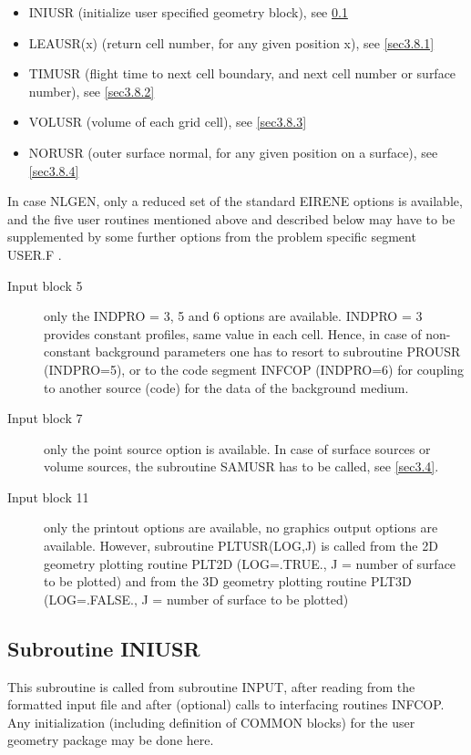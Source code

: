 \begin{itemize}
  \item INIUSR (initialize user specified geometry block), see \cref{sec3.8.0}
  \item LEAUSR(x) (return cell number, for any given position x), see
        \cref{sec3.8.1}
  \item TIMUSR (flight time to next cell boundary, and next cell
        number or surface number), see \cref{sec3.8.2}
  \item VOLUSR (volume of each
        grid cell), see \cref{sec3.8.3}
  \item NORUSR (outer surface normal, for any
        given position on a surface), see \cref{sec3.8.4}
\end{itemize}
In case NLGEN,
only a reduced set of the standard EIRENE options is available, and the five
user routines mentioned above and described below may have to be supplemented
by some further options from the problem specific segment USER.F .
\begin{description}
  \item[Input block 5] 

        only the INDPRO = 3, 5 and 6 options are available.
        INDPRO = 3 provides constant profiles, same value in each cell.
        Hence, in case of non-constant background parameters one has to resort to
        subroutine PROUSR (INDPRO=5), or to the code segment INFCOP (INDPRO=6) for
        coupling to another source (code) for the data of the background medium.
  \item[Input block 7] only the point source option is available.
        In case of surface sources or volume sources, the subroutine SAMUSR has to be
        called, see \cref{sec3.4}.
  \item[Input block 11] only the printout options are available, no graphics
        output options are available.
        However, subroutine PLTUSR(LOG,J) is called from the 2D geometry plotting
        routine PLT2D (LOG=.TRUE., J = number of surface to be plotted) and from the 3D
        geometry plotting routine PLT3D (LOG=.FALSE., J = number of surface to be
        plotted)
\end{description}

\subsection{Subroutine INIUSR} \label{sec3.8.0} 

This subroutine is called from subroutine INPUT, after reading from the
formatted input file and after (optional) calls to interfacing routines INFCOP.
Any initialization (including definition of COMMON blocks) for the user
geometry package may be done here.

